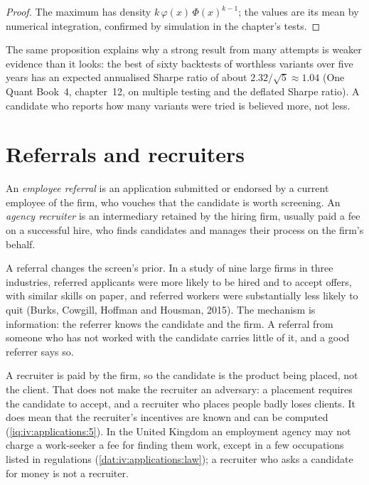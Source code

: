 \begin{proof}
The maximum has density $k\,\varphi(x)\,\Phi(x)^{k-1}$; the values are its mean by numerical integration,
confirmed by simulation in the chapter's tests.
\end{proof}

The same proposition explains why a strong result from many attempts is weaker evidence than it looks: the
best of sixty backtests of worthless variants over five years has an expected annualised Sharpe ratio of about
$2.32/\sqrt{5} \approx 1.04$ (One Quant Book~4, chapter~12, on multiple testing and the deflated Sharpe
ratio). A candidate who reports how many variants were tried is believed more, not less.

\section{Referrals and recruiters}

\begin{definition}\label{def:iv:applications:referral}
An \emph{employee referral} is an application submitted or endorsed by a current
employee of the firm, who vouches that the candidate is worth screening. An \emph{agency
recruiter} is an intermediary retained by the hiring firm, usually paid a fee on a
successful hire, who finds candidates and manages their process on the firm's behalf.
\end{definition}

A referral changes the screen's prior. In a study of nine large firms in three industries, referred applicants
were more likely to be hired and to accept offers, with similar skills on paper, and referred workers were
substantially less likely to quit (Burks, Cowgill, Hoffman and Housman, 2015). The mechanism is information:
the referrer knows the candidate and the firm. A referral from someone who has not worked with the candidate
carries little of it, and a good referrer says so.

A recruiter is paid by the firm, so the candidate is the product being placed, not the client. That does not
make the recruiter an adversary: a placement requires the candidate to accept, and a recruiter who places
people badly loses clients. It does mean that the recruiter's incentives are known and can be computed
(\cref{iq:iv:applications:5}). In the United Kingdom an employment agency may not charge a work-seeker a fee
for finding them work, except in a few occupations listed in regulations (\cref{dat:iv:applications:law});
a recruiter who asks a candidate for money is not a recruiter.

